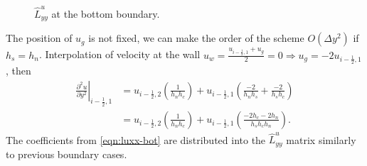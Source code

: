 \documentclass{article}
\numberwithin{equation}{section}
\begin{document}
\begin{figure}[H] %
  \caption{$\hat{L}^u_{yy}$ at the bottom boundary.}\label{fig:luxx-bottom}
\end{figure}

The position of $u_g$ is not fixed, we can make the order of the scheme $O(\Delta y^2)$ if $h_s=h_n$. Interpolation of velocity at the wall $u_{w} =\frac{u_{i-\frac{1}{2},1}+u_g}{2}=0 \Rightarrow u_g=-2 u_{i-\frac{1}{2},1}$, then
\begin{equation}\label{eqn:luxx-bot}
\begin{aligned}
\left.\frac{\partial^2 u}{\partial y^2}\right|_{i-\frac{1}{2},1} 
& =u_{i-\frac{1}{2},2}\left(\frac{1}{h_n h_c}\right)+u_{i-\frac{1}{2},1}\left(\frac{-2}{h_n h_s}+\frac{-2}{h_s h_c}\right) \\
& =u_{i-\frac{1}{2},2}\left(\frac{1}{h_n h_c}\right)+u_{i-\frac{1}{2},1}\left(\frac{-2 h_c-2 h_n}{h_s h_c h_n}\right).
\end{aligned}
\end{equation}
The coefficients from \cref{eqn:luxx-bot} are distributed into the $\hat{L}^u_{yy}$ matrix similarly to previous boundary cases.
\end{document}
